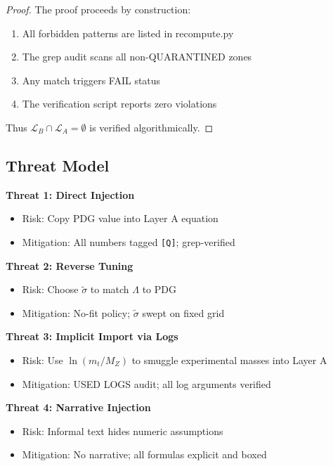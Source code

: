 \documentclass[11pt,a4paper]{article}
\theoremstyle{definition}
\begin{document}
\begin{proof}
The proof proceeds by construction:
\begin{enumerate}
  \item All forbidden patterns are listed in recompute.py
  \item The grep audit scans all non-QUARANTINED zones
  \item Any match triggers FAIL status
  \item The verification script reports zero violations
\end{enumerate}
Thus $\mathcal{L}_B \cap \mathcal{L}_A = \emptyset$ is verified algorithmically.
\end{proof}

\subsection{Threat Model}
\label{subsec:threat-model}

\begin{threatbox}
\textbf{Threat 1: Direct Injection}
\begin{itemize}
  \item Risk: Copy PDG value into Layer A equation
  \item Mitigation: All numbers tagged \texttt{[Q]}; grep-verified
\end{itemize}

\textbf{Threat 2: Reverse Tuning}
\begin{itemize}
  \item Risk: Choose $\tilde{\sigma}$ to match $\Lambda$ to PDG
  \item Mitigation: No-fit policy; $\tilde{\sigma}$ swept on fixed grid
\end{itemize}

\textbf{Threat 3: Implicit Import via Logs}
\begin{itemize}
  \item Risk: Use $\ln(m_t/M_Z)$ to smuggle experimental masses into Layer A
  \item Mitigation: USED LOGS audit; all log arguments verified
\end{itemize}

\textbf{Threat 4: Narrative Injection}
\begin{itemize}
  \item Risk: Informal text hides numeric assumptions
  \item Mitigation: No narrative; all formulas explicit and boxed
\end{itemize}
\end{threatbox}
\end{document}
